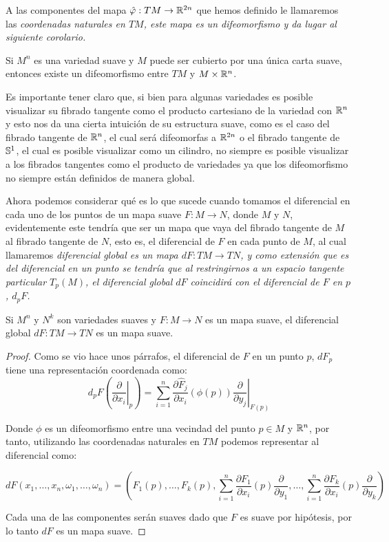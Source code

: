 A las componentes del mapa $\hat{\phi}: TM \to \R^{2n}$ que hemos definido le llamaremos las \it{coordenadas naturales en $TM$}, este mapa es un difeomorfismo y da lugar al siguiente corolario.

\begin{corollary}
	Si $M^n$ es una variedad suave y $M$ puede ser cubierto por una única carta suave, entonces existe un difeomorfismo entre $TM$ y $M \times \R^n$.
\end{corollary}

Es importante tener claro que, si bien para algunas variedades es posible visualizar su fibrado tangente como el producto cartesiano de la variedad con $\R^n$ y esto nos da una cierta intuición de su estructura suave, como es el caso del fibrado tangente de $\R^n$, el cual será difeomorfas a $\R^{2n}$ o el fibrado tangente de $\S^{1}$, el cual es posible visualizar como un cilindro, no siempre es posible visualizar a los fibrados tangentes como el producto de variedades ya que los difeomorfismo no siempre están definidos de manera global.

Ahora podemos considerar qué es lo que sucede cuando tomamos el diferencial en cada uno de los puntos de un mapa suave $F: M \to N$, donde $M$ y $N$, evidentemente este tendría que ser un mapa que vaya del fibrado tangente de $M$ al fibrado tangente de $N$, esto es, el diferencial de $F$ en cada punto de $M$, al cual llamaremos \it{diferencial global} es un mapa $dF: TM \to TN$, y como extensión que es del diferencial en un punto se tendría que al restringirnos a un espacio tangente particular $T_p(M)$, el diferencial global $dF$ coincidirá con el diferencial de $F$ en $p$, $d_pF$.

\begin{theorem}
	Si $M^{n}$ y $N^{k}$ son variedades suaves y $F: M \to N$ es un mapa suave, el diferencial global $dF: TM \to TN$ es un mapa suave.
\end{theorem}

\begin{proof}
	Como se vio hace unos párrafos, el diferencial de $F$ en un punto $p$, $dF_p$ tiene una representación coordenada como:
	\[
		d_pF \left( \left. \frac{\partial}{\partial x_i} \right|_{p}\right)
		=
		\sum_{i=1}^{n} \frac{\partial \hat{F}_j}{\partial x_i} (\phi(p)) \left. \frac{\partial}{\partial y_j} \right|_{F(p)}
	\]

	Donde $\phi$ es un difeomorfismo entre una vecindad del punto $p \in M$ y $\R^n$, por tanto, utilizando las coordenadas naturales en $TM$ podemos representar al diferencial como:

	\[
		dF(x_1, \dots, x_n, \omega_1, \dots, \omega_n) =
		\left(
		F_1(p), \dots, F_k(p), \sum_{i=1}^{n} \frac{\partial F_1}{\partial x_i}(p) \frac{\partial}{\partial y_1}, \dots, \sum_{i=1}^{n} \frac{\partial F_k}{\partial x_i} (p)\frac{\partial}{\partial y_k}
		\right)
	\]

	Cada una de las componentes serán suaves dado que $F$ es suave por hipótesis, por lo tanto $dF$ es un mapa suave.
\end{proof}


